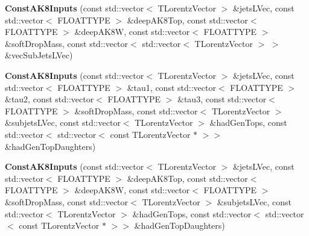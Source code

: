 \begin{DoxyCompactItemize}
\item 
\hypertarget{classttUtility_1_1ConstAK8Inputs_a76f8e1333bd69c7910196a0783317492}{{\bfseries Const\-A\-K8\-Inputs} (const std\-::vector$<$ T\-Lorentz\-Vector $>$ \&jets\-L\-Vec, const std\-::vector$<$ F\-L\-O\-A\-T\-T\-Y\-P\-E $>$ \&deep\-A\-K8\-Top, const std\-::vector$<$ F\-L\-O\-A\-T\-T\-Y\-P\-E $>$ \&deep\-A\-K8\-W, const std\-::vector$<$ F\-L\-O\-A\-T\-T\-Y\-P\-E $>$ \&soft\-Drop\-Mass, const std\-::vector$<$ std\-::vector$<$ T\-Lorentz\-Vector $>$ $>$ \&vec\-Sub\-Jets\-L\-Vec)}\label{classttUtility_1_1ConstAK8Inputs_a76f8e1333bd69c7910196a0783317492}

\item 
\hypertarget{classttUtility_1_1ConstAK8Inputs_aa102483387045bf6e6ca9250f39d1a09}{{\bfseries Const\-A\-K8\-Inputs} (const std\-::vector$<$ T\-Lorentz\-Vector $>$ \&jets\-L\-Vec, const std\-::vector$<$ F\-L\-O\-A\-T\-T\-Y\-P\-E $>$ \&tau1, const std\-::vector$<$ F\-L\-O\-A\-T\-T\-Y\-P\-E $>$ \&tau2, const std\-::vector$<$ F\-L\-O\-A\-T\-T\-Y\-P\-E $>$ \&tau3, const std\-::vector$<$ F\-L\-O\-A\-T\-T\-Y\-P\-E $>$ \&soft\-Drop\-Mass, const std\-::vector$<$ T\-Lorentz\-Vector $>$ \&subjets\-L\-Vec, const std\-::vector$<$ T\-Lorentz\-Vector $>$ \&had\-Gen\-Tops, const std\-::vector$<$ std\-::vector$<$ const T\-Lorentz\-Vector $\ast$ $>$$>$ \&had\-Gen\-Top\-Daughters)}\label{classttUtility_1_1ConstAK8Inputs_aa102483387045bf6e6ca9250f39d1a09}

\item 
\hypertarget{classttUtility_1_1ConstAK8Inputs_a0317b83ccf5b89ed24dd26ca351ff4a1}{{\bfseries Const\-A\-K8\-Inputs} (const std\-::vector$<$ T\-Lorentz\-Vector $>$ \&jets\-L\-Vec, const std\-::vector$<$ F\-L\-O\-A\-T\-T\-Y\-P\-E $>$ \&deep\-A\-K8\-Top, const std\-::vector$<$ F\-L\-O\-A\-T\-T\-Y\-P\-E $>$ \&deep\-A\-K8\-W, const std\-::vector$<$ F\-L\-O\-A\-T\-T\-Y\-P\-E $>$ \&soft\-Drop\-Mass, const std\-::vector$<$ T\-Lorentz\-Vector $>$ \&subjets\-L\-Vec, const std\-::vector$<$ T\-Lorentz\-Vector $>$ \&had\-Gen\-Tops, const std\-::vector$<$ std\-::vector$<$ const T\-Lorentz\-Vector $\ast$ $>$$>$ \&had\-Gen\-Top\-Daughters)}\label{classttUtility_1_1ConstAK8Inputs_a0317b83ccf5b89ed24dd26ca351ff4a1}


\end{DoxyCompactItemize}
